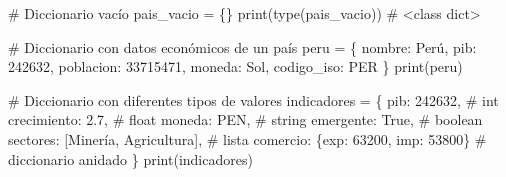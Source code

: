 \documentclass[
  doc,
  floatsintext,
  longtable,
  a4paper,
  nolmodern,
  notxfonts,
  notimes,
  12pt,
  colorlinks=true,linkcolor=blue,citecolor=blue,urlcolor=blue]{apa7}
\newenvironment{Shaded}{\begin{snugshade}}{\end{snugshade}}
\newcommand{\BuiltInTok}[1]{\textcolor[rgb]{0.00,0.23,0.31}{#1}}
\newcommand{\CommentTok}[1]{\textcolor[rgb]{0.37,0.37,0.37}{#1}}
\newcommand{\DecValTok}[1]{\textcolor[rgb]{0.68,0.00,0.00}{#1}}
\newcommand{\FloatTok}[1]{\textcolor[rgb]{0.68,0.00,0.00}{#1}}
\newcommand{\NormalTok}[1]{\textcolor[rgb]{0.00,0.23,0.31}{#1}}
\newcommand{\OperatorTok}[1]{\textcolor[rgb]{0.37,0.37,0.37}{#1}}
\newcommand{\StringTok}[1]{\textcolor[rgb]{0.13,0.47,0.30}{#1}}
\newcommand{\VariableTok}[1]{\textcolor[rgb]{0.07,0.07,0.07}{#1}}
\begin{document}
\begin{Shaded}
\begin{Highlighting}[]
\CommentTok{\# Diccionario vacío}
\NormalTok{pais\_vacio }\OperatorTok{=}\NormalTok{ \{\}}
\BuiltInTok{print}\NormalTok{(}\BuiltInTok{type}\NormalTok{(pais\_vacio))  }\CommentTok{\# \textless{}class \textquotesingle{}dict\textquotesingle{}\textgreater{}}

\CommentTok{\# Diccionario con datos económicos de un país}
\NormalTok{peru }\OperatorTok{=}\NormalTok{ \{}
    \StringTok{\textquotesingle{}nombre\textquotesingle{}}\NormalTok{: }\StringTok{\textquotesingle{}Perú\textquotesingle{}}\NormalTok{,}
    \StringTok{\textquotesingle{}pib\textquotesingle{}}\NormalTok{: }\DecValTok{242632}\NormalTok{,}
    \StringTok{\textquotesingle{}poblacion\textquotesingle{}}\NormalTok{: }\DecValTok{33715471}\NormalTok{,}
    \StringTok{\textquotesingle{}moneda\textquotesingle{}}\NormalTok{: }\StringTok{\textquotesingle{}Sol\textquotesingle{}}\NormalTok{,}
    \StringTok{\textquotesingle{}codigo\_iso\textquotesingle{}}\NormalTok{: }\StringTok{\textquotesingle{}PER\textquotesingle{}}
\NormalTok{\}}
\BuiltInTok{print}\NormalTok{(peru)}

\CommentTok{\# Diccionario con diferentes tipos de valores}
\NormalTok{indicadores }\OperatorTok{=}\NormalTok{ \{}
    \StringTok{\textquotesingle{}pib\textquotesingle{}}\NormalTok{: }\DecValTok{242632}\NormalTok{,              }\CommentTok{\# int}
    \StringTok{\textquotesingle{}crecimiento\textquotesingle{}}\NormalTok{: }\FloatTok{2.7}\NormalTok{,          }\CommentTok{\# float}
    \StringTok{\textquotesingle{}moneda\textquotesingle{}}\NormalTok{: }\StringTok{\textquotesingle{}PEN\textquotesingle{}}\NormalTok{,             }\CommentTok{\# string}
    \StringTok{\textquotesingle{}emergente\textquotesingle{}}\NormalTok{: }\VariableTok{True}\NormalTok{,           }\CommentTok{\# boolean}
    \StringTok{\textquotesingle{}sectores\textquotesingle{}}\NormalTok{: [}\StringTok{\textquotesingle{}Minería\textquotesingle{}}\NormalTok{, }\StringTok{\textquotesingle{}Agricultura\textquotesingle{}}\NormalTok{],  }\CommentTok{\# lista}
    \StringTok{\textquotesingle{}comercio\textquotesingle{}}\NormalTok{: \{}\StringTok{\textquotesingle{}exp\textquotesingle{}}\NormalTok{: }\DecValTok{63200}\NormalTok{, }\StringTok{\textquotesingle{}imp\textquotesingle{}}\NormalTok{: }\DecValTok{53800}\NormalTok{\}  }\CommentTok{\# diccionario anidado}
\NormalTok{\}}
\BuiltInTok{print}\NormalTok{(indicadores)}
\end{Highlighting}
\end{Shaded}
\end{document}
